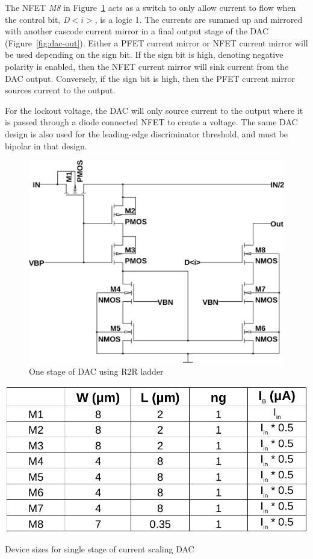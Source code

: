 \documentclass[12pt,oneside,final]{siuethesis}
\theoremstyle{definition}
\begin{document}
\par The NFET \emph{M8} in Figure~\ref{fig:dac} acts as a switch to only allow current to flow when the control bit, \emph{D$<i>$}, is a logic 1. The currents are summed up and mirrored with another cascode current mirror in a final output stage of the DAC (Figure~\ref{fig:dac-out}). Either a PFET current mirror or NFET current mirror will be used depending on the sign bit. If the sign bit is high, denoting negative polarity is enabled, then the NFET current mirror will sink current from the DAC output. Conversely, if the sign bit is high, then the PFET current mirror sources current to the output.
\par For the lockout voltage, the DAC will only source current to the output where it is passed through a diode connected NFET to create a voltage. The same DAC design is also used for the leading-edge discriminator threshold, and must be bipolar in that design. 

\begin{figure}[htbp!]
\centering
\includegraphics[scale=.4,keepaspectratio=true]{../LTspice_Drawings/dac/dac_stage.png} 
\caption{One stage of DAC using R2R ladder}
\label{fig:dac}
\end{figure}

\begin{table}[htbp!]
 \centering
 \includegraphics[scale=.35,keepaspectratio=true]{./ch3_figures/dac_bit_sizes.png}
 \caption{Device sizes for single stage of current scaling DAC}
 \label{tab:dac-bit-sizes}
\end{table}
\end{document}
